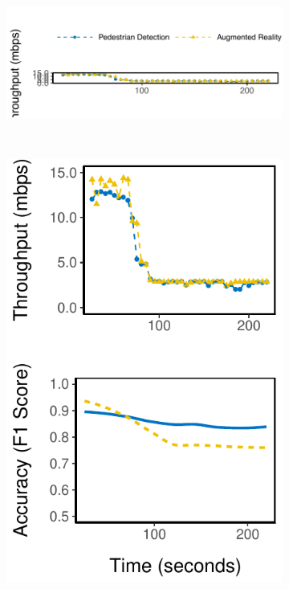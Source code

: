 \begin{figure}
  \begin{subfigure}[t]{0.9\columnwidth}
    \centering
    \includegraphics[width=\textwidth]{figures/multitask-legend.pdf}
  \end{subfigure}
  \\
  \vspace{1em}
  \begin{subfigure}[t]{0.49\columnwidth}
    \centering
    \includegraphics[width=\textwidth]{figures/multitask-eq-bw.pdf}

\end{subfigure}
\end{figure}
